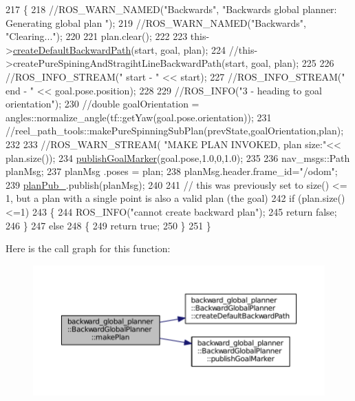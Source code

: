 \begin{DoxyCode}
217 \{
218     \textcolor{comment}{//ROS\_WARN\_NAMED("Backwards", "Backwards global planner: Generating global plan ");}
219     \textcolor{comment}{//ROS\_WARN\_NAMED("Backwards", "Clearing...");}
220 
221     plan.clear();
222 
223     this->\hyperlink{classbackward__global__planner_1_1BackwardGlobalPlanner_a625dba5902c088241ab25c9fb628fd04}{createDefaultBackwardPath}(start, goal, plan);
224     \textcolor{comment}{//this->createPureSpiningAndStragihtLineBackwardPath(start, goal, plan);}
225 
226     \textcolor{comment}{//ROS\_INFO\_STREAM(" start - " << start);}
227     \textcolor{comment}{//ROS\_INFO\_STREAM(" end - " << goal.pose.position);}
228      
229     \textcolor{comment}{//ROS\_INFO("3 - heading to goal orientation");}
230     \textcolor{comment}{//double goalOrientation = angles::normalize\_angle(tf::getYaw(goal.pose.orientation));}
231     \textcolor{comment}{//reel\_path\_tools::makePureSpinningSubPlan(prevState,goalOrientation,plan);}
232 
233     \textcolor{comment}{//ROS\_WARN\_STREAM( "MAKE PLAN INVOKED, plan size:"<< plan.size());}
234     \hyperlink{classbackward__global__planner_1_1BackwardGlobalPlanner_af1211f3b9a8d1c35bb4ba3e17c7758e9}{publishGoalMarker}(goal.pose,1.0,0,1.0);
235 
236     nav\_msgs::Path planMsg;
237     planMsg .poses = plan;
238     planMsg.header.frame\_id=\textcolor{stringliteral}{"/odom"};
239     \hyperlink{classbackward__global__planner_1_1BackwardGlobalPlanner_ad51fd6aecf673a500ec828b796d68228}{planPub\_}.publish(planMsg);
240 
241     \textcolor{comment}{// this was previously set to size() <= 1, but a plan with a single point is also a valid plan (the
       goal)}
242     \textcolor{keywordflow}{if} (plan.size() <=1)
243     \{
244         ROS\_INFO(\textcolor{stringliteral}{"cannot create backward plan"});
245         \textcolor{keywordflow}{return} \textcolor{keyword}{false};
246     \}
247     \textcolor{keywordflow}{else}
248     \{
249         \textcolor{keywordflow}{return} \textcolor{keyword}{true};
250     \}
251 \}
\end{DoxyCode}


Here is the call graph for this function\+:
\nopagebreak
\begin{figure}[H]
\begin{center}
\leavevmode
\includegraphics[width=350pt]{classbackward__global__planner_1_1BackwardGlobalPlanner_a39f2e0d5090f0776942d7cd68eecbde1_cgraph}
\end{center}
\end{figure}




